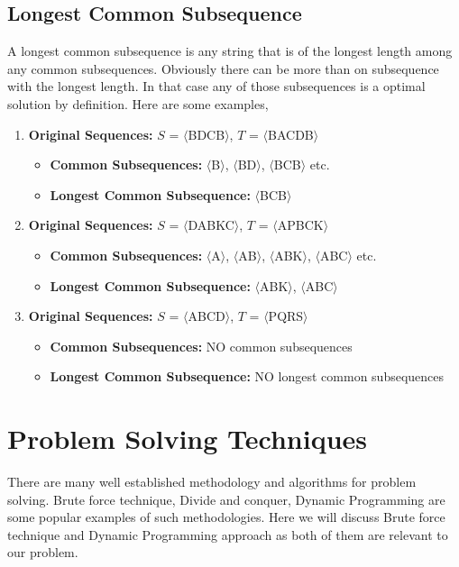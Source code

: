 \documentclass{report}
\begin{document}
    \section{Longest Common Subsequence}{
    \bigskip
    A longest common subsequence is any string that is of the longest length among any common subsequences. Obviously there can be more than on subsequence with the longest length. In that case any of those subsequences is a optimal solution by definition. Here are some examples,
    \begin{enumerate}
        \bigskip
        \item {\textbf{Original Sequences:} $S$ = $\langle$BDCB$\rangle$,  $T$ = $\langle$BACDB$\rangle$}
            \begin{itemize}
                \item {\textbf{Common Subsequences:} $\langle$B$\rangle$, $\langle$BD$\rangle$, $\langle$BCB$\rangle$ etc.}
                \item {\textbf{Longest Common Subsequence:} $\langle$BCB$\rangle$}
            \end{itemize}
        \bigskip
        \item {\textbf{Original Sequences:}} $S$ = $\langle$DABKC$\rangle$,  $T$ = $\langle$APBCK$\rangle$
            \begin{itemize}
                \item \textbf{Common Subsequences:} $\langle$A$\rangle$, $\langle$AB$\rangle$, $\langle$ABK$\rangle$, $\langle$ABC$\rangle$ etc.
                \item \textbf{Longest Common Subsequence:} $\langle$ABK$\rangle$, $\langle$ABC$\rangle$
            \end{itemize}
        \bigskip
        \item {\textbf{Original Sequences:}} $S$ = $\langle$ABCD$\rangle$,  $T$ = $\langle$PQRS$\rangle$
            \begin{itemize}
                \item \textbf{Common Subsequences:} NO common subsequences
                \item \textbf{Longest Common Subsequence:} NO longest common subsequences
            \end{itemize}
    \end{enumerate}    
        
    
    }
    
    \newpage
    
    
    \chapter{Problem Solving Techniques}
    \bigskip
    There are many well established methodology and algorithms for problem solving.
    Brute force technique, Divide and conquer, Dynamic Programming are some popular examples of such methodologies. Here we will discuss Brute force technique and Dynamic Programming approach as both of them are relevant to our problem.
    \bigskip
\end{document}
